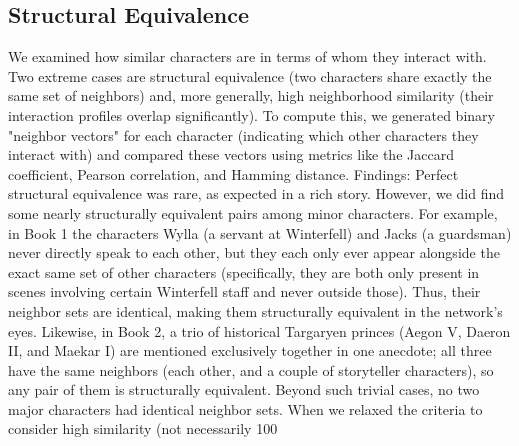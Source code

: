 \documentclass[12pt, a4paper]{article}
\begin{document}
\subsection*{Structural Equivalence} 
We examined how similar characters are in terms of whom they interact with. Two extreme cases are structural equivalence (two characters share exactly the same set of neighbors) and, more generally, high neighborhood similarity (their interaction profiles overlap significantly). To compute this, we generated binary "neighbor vectors" for each character (indicating which other characters they interact with) and compared these vectors using metrics like the Jaccard coefficient, Pearson correlation, and Hamming distance. Findings: Perfect structural equivalence was rare, as expected in a rich story. However, we did find some nearly structurally equivalent pairs among minor characters. For example, in Book 1 the characters Wylla (a servant at Winterfell) and Jacks (a guardsman) never directly speak to each other, but they each only ever appear alongside the exact same set of other characters (specifically, they are both only present in scenes involving certain Winterfell staff and never outside those). Thus, their neighbor sets are identical, making them structurally equivalent in the network's eyes. Likewise, in Book 2, a trio of historical Targaryen princes (Aegon V, Daeron II, and Maekar I) are mentioned exclusively together in one anecdote; all three have the same neighbors (each other, and a couple of storyteller characters), so any pair of them is structurally equivalent. Beyond such trivial cases, no two major characters had identical neighbor sets. When we relaxed the criteria to consider high similarity (not necessarily 100%
\end{document}

